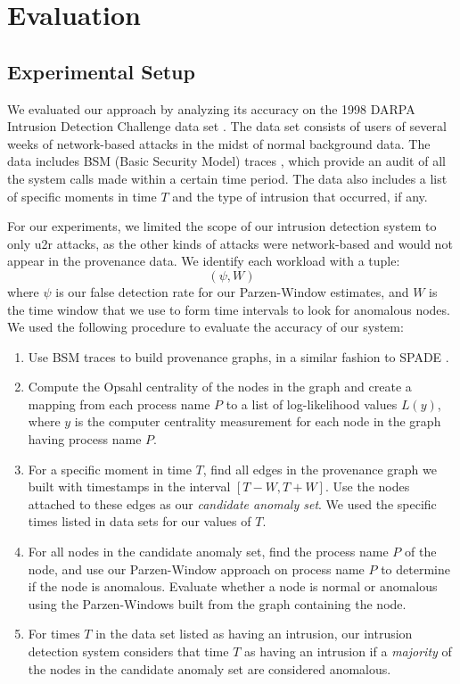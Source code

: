 \documentclass[10pt,twocolumn]{article}
\begin{document}
%

\section{Evaluation}

\subsection{Experimental Setup}

We evaluated our approach by analyzing its accuracy on the 1998 DARPA Intrusion Detection Challenge data set \cite{darpa}.
The data set consists of users of several weeks of network-based attacks in the midst of normal
background data. The data includes BSM (Basic Security Model) traces \cite{bsm}, which provide an
audit of all the system calls made within a certain time period. The data also includes a list
of specific moments in time $T$ and the type of intrusion that occurred, if any.

For our experiments, we limited the scope of our intrusion detection system to only u2r attacks, as
the other kinds of attacks were network-based and would not appear in the provenance data. 
We identify each workload with a tuple:
$$(\psi, W)$$
where $\psi$ is our false detection rate for our Parzen-Window
estimates, and $W$ is the time window that we use to form time intervals to look for anomalous nodes. We used
the following procedure to evaluate the accuracy of our system: 
\begin{enumerate}
\item Use BSM traces to build provenance graphs, in a similar fashion to SPADE \cite{spade}. 
\item Compute the Opsahl centrality of the nodes in the graph and create a mapping from each process
name $P$ to a list of log-likelihood values $L(y)$, where $y$ is the computer centrality measurement for each node in the graph having process name $P$.
\item For a specific moment in time $T$, find all edges in the provenance graph we built with timestamps in the interval $[T - W, T + W]$. 
Use the nodes attached to these edges as our {\em candidate anomaly set}. We used the specific times listed in data sets for our values of $T$.
\item For all nodes in the candidate anomaly set, find the process name $P$ of the node, and use our Parzen-Window approach on process
name $P$ to determine if the node is anomalous. Evaluate whether a node is normal or anomalous using the Parzen-Windows built from the graph
containing the node.
\item For times $T$ in the data set listed as having an intrusion, our intrusion detection system considers that time $T$ as having an intrusion
if a {\em majority} of the nodes in the candidate anomaly set are considered anomalous.
\end{enumerate}
\end{document}
